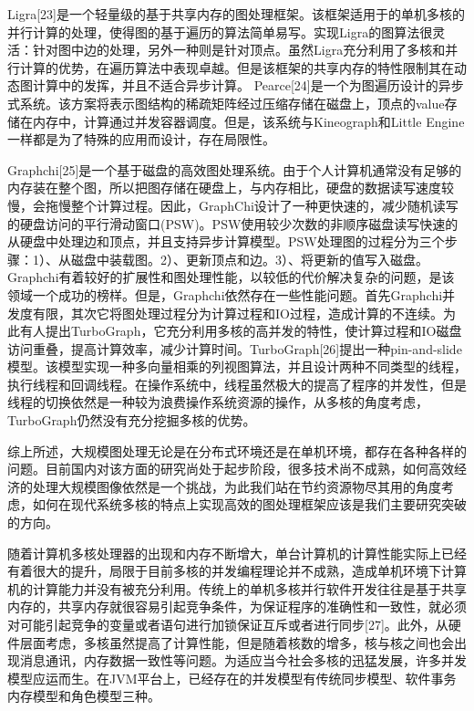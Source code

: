 Ligra[23]是一个轻量级的基于共享内存的图处理框架。该框架适用于的单机多核的并行计算的处理，使得图的基于遍历的算法简单易写。实现Ligra的图算法很灵活：针对图中边的处理，另外一种则是针对顶点。虽然Ligra充分利用了多核和并行计算的优势，在遍历算法中表现卓越。但是该框架的共享内存的特性限制其在动态图计算中的发挥，并且不适合异步计算。
Pearce[24]是一个为图遍历设计的异步式系统。该方案将表示图结构的稀疏矩阵经过压缩存储在磁盘上，顶点的value存储在内存中，计算通过并发容器调度。但是，该系统与Kineograph和Little Engine一样都是为了特殊的应用而设计，存在局限性。

Graphchi[25]是一个基于磁盘的高效图处理系统。由于个人计算机通常没有足够的内存装在整个图，所以把图存储在硬盘上，与内存相比，硬盘的数据读写速度较慢，会拖慢整个计算过程。因此，GraphChi设计了一种更快速的，减少随机读写的硬盘访问的平行滑动窗口(PSW)。PSW使用较少次数的非顺序磁盘读写快速的从硬盘中处理边和顶点，并且支持异步计算模型。PSW处理图的过程分为三个步骤：1）、从磁盘中装载图。2）、更新顶点和边。3）、将更新的值写入磁盘。Graphchi有着较好的扩展性和图处理性能，以较低的代价解决复杂的问题，是该领域一个成功的榜样。但是，Graphchi依然存在一些性能问题。首先Graphchi并发度有限，其次它将图处理过程分为计算过程和IO过程，造成计算的不连续。为此有人提出TurboGraph，它充分利用多核的高并发的特性，使计算过程和IO磁盘访问重叠，提高计算效率，减少计算时间。TurboGraph[26]提出一种pin-and-slide模型。该模型实现一种多向量相乘的列视图算法，并且设计两种不同类型的线程，执行线程和回调线程。在操作系统中，线程虽然极大的提高了程序的并发性，但是线程的切换依然是一种较为浪费操作系统资源的操作，从多核的角度考虑，TurboGraph仍然没有充分挖掘多核的优势。

综上所述，大规模图处理无论是在分布式环境还是在单机环境，都存在各种各样的问题。目前国内对该方面的研究尚处于起步阶段，很多技术尚不成熟，如何高效经济的处理大规模图像依然是一个挑战，为此我们站在节约资源物尽其用的角度考虑，如何在现代系统多核的特点上实现高效的图处理框架应该是我们主要研究突破的方向。

随着计算机多核处理器的出现和内存不断增大，单台计算机的计算性能实际上已经有着很大的提升，局限于目前多核的并发编程理论并不成熟，造成单机环境下计算机的计算能力并没有被充分利用。传统上的单机多核并行软件开发往往是基于共享内存的，共享内存就很容易引起竞争条件，为保证程序的准确性和一致性，就必须对可能引起竞争的变量或者语句进行加锁保证互斥或者进行同步[27]。此外，从硬件层面考虑，多核虽然提高了计算性能，但是随着核数的增多，核与核之间也会出现消息通讯，内存数据一致性等问题。为适应当今社会多核的迅猛发展，许多并发模型应运而生。在JVM平台上，已经存在的并发模型有传统同步模型、软件事务内存模型和角色模型三种。

